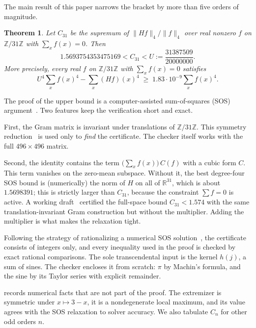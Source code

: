 \documentclass[11pt]{amsart}
\newtheorem{theorem}{Theorem}[section]
\theoremstyle{definition}
\theoremstyle{remark}
\newcommand{\Z}{\mathbb{Z}}
\newcommand{\R}{\mathbb{R}}
\newcommand{\ZN}{\Z/31\Z}
\begin{document}
The main result of this paper narrows the bracket by more than five orders of magnitude.

\begin{theorem}\label{thm:main}
Let $C_{31}$ be the supremum of $\|Hf\|_4/\|f\|_4$ over real nonzero $f$ on $\ZN$ with $\sum_x f(x)=0$. Then
\[
  1.5693754353475169 < C_{31} < U := \frac{31387509}{20000000}.
\]
More precisely, every real $f$ on $\ZN$ with $\sum_x f(x)=0$ satisfies
\begin{equation}\label{eq:main}
  U^4\sum_{x} f(x)^4-\sum_x (Hf)(x)^4 \;\ge\; 1.83\cdot 10^{-9}\sum_x f(x)^4 .
\end{equation}
\end{theorem}

The proof of the upper bound is a computer-assisted sum-of-squares (SOS) argument~\cite{Lasserre2001,Parrilo2003}. Two features keep the verification short and exact.

First, the Gram matrix is invariant under translations of $\ZN$. This symmetry reduction~\cite{GatermannParrilo2004} is used only to \emph{find} the certificate. The checker itself works with the full $496\times496$ matrix.

Second, the identity contains the term $\bigl(\sum_x f(x)\bigr)\,C(f)$ with a cubic form $C$. This term vanishes on the zero-mean subspace. Without it, the best degree-four SOS bound is (numerically) the norm of $H$ on all of $\R^{31}$, which is about $1.5698391$; this is strictly larger than $C_{31}$, because the constraint $\sum f=0$ is active. A working draft~\cite{draft2026} certified the full-space bound $C_{31}<1.574$ with the same translation-invariant Gram construction but without the multiplier. Adding the multiplier is what makes the relaxation tight.

Following the strategy of rationalizing a numerical SOS solution~\cite{PeyrlParrilo2008,KaltofenLiYangZhi2008}, the certificate consists of integers only, and every inequality used in the proof is checked by exact rational comparisons. The sole transcendental input is the kernel $h(j)$, a sum of sines. The checker encloses it from scratch: $\pi$ by Machin's formula, and the sine by its Taylor series with explicit remainder.

 records numerical facts that are not part of the proof. The extremizer is symmetric under $x\mapsto 3-x$, it is a nondegenerate local maximum, and its value agrees with the SOS relaxation to solver accuracy. We also tabulate $C_n$ for other odd orders $n$.
\end{document}
